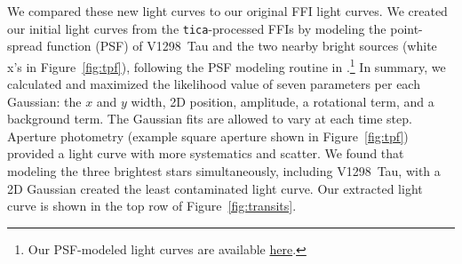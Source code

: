 \documentclass[twocolumn]{aastex631}
\newcommand{\sname}{V1298~Tau\xspace}
\begin{document}
We compared these new light curves to our original FFI light curves. We created our initial light curves from the \texttt{tica}-processed FFIs by modeling the point-spread function (PSF) of \sname and the two nearby bright sources (white x's in Figure~\ref{fig:tpf}), following the PSF modeling routine in \cite{feinstein19}.\footnote{Our PSF-modeled light curves are available \href{https://github.com/afeinstein20/v1298tau_tess/tree/main/lightcurves}{here}.} In summary, we calculated and maximized the likelihood value of seven parameters per each Gaussian: the $x$ and $y$ width, 2D position, amplitude, a rotational term, and a background term. The Gaussian fits are allowed to vary at each time step. Aperture photometry (example square aperture shown in Figure~\ref{fig:tpf}) provided a light curve with more systematics and scatter. We found that modeling the three brightest stars simultaneously, including \sname, with a 2D Gaussian created the least contaminated light curve. Our extracted light curve is shown in the top row of Figure~\ref{fig:transits}.
\end{document}
